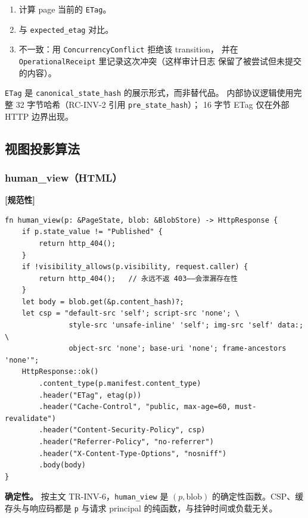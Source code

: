 \documentclass[11pt,a4paper]{article}
\newcommand{\normsv}{\textcolor{normativecolor}{\textbf{[规范性]}}\xspace}
\theoremstyle{definition}
\begin{document}
\begin{enumerate}[leftmargin=2.2em,itemsep=0.2em]
    \item 计算 page 当前的 \texttt{ETag}。
    \item 与 \texttt{expected\_etag} 对比。
    \item 不一致：用 \texttt{ConcurrencyConflict} 拒绝该 transition，
    并在 \texttt{OperationalReceipt} 里记录这次冲突（这样审计日志
    保留了被尝试但未提交的内容）。
\end{enumerate}

\begin{notebox}
\texttt{ETag} 是 \texttt{canonical\_state\_hash} 的展示形式，而非替代品。
内部协议逻辑使用完整 32 字节哈希（RC-INV-2 引用 \texttt{pre\_state\_hash}）；
16 字节 ETag 仅在外部 HTTP 边界出现。
\end{notebox}

\subsection{视图投影算法}
\label{sec:algo-views}

\subsubsection{human\_view（HTML）}

\normsv{}

\begin{lstlisting}
fn human_view(p: &PageState, blob: &BlobStore) -> HttpResponse {
    if p.state_value != "Published" {
        return http_404();
    }
    if !visibility_allows(p.visibility, request.caller) {
        return http_404();   // 永远不返 403——会泄漏存在性
    }
    let body = blob.get(&p.content_hash)?;
    let csp = "default-src 'self'; script-src 'none'; \
               style-src 'unsafe-inline' 'self'; img-src 'self' data:; \
               object-src 'none'; base-uri 'none'; frame-ancestors 'none'";
    HttpResponse::ok()
        .content_type(p.manifest.content_type)
        .header("ETag", etag(p))
        .header("Cache-Control", "public, max-age=60, must-revalidate")
        .header("Content-Security-Policy", csp)
        .header("Referrer-Policy", "no-referrer")
        .header("X-Content-Type-Options", "nosniff")
        .body(body)
}
\end{lstlisting}

\textbf{确定性。} 按主文 TR-INV-6，\texttt{human\_view} 是
$(p, \text{blob})$ 的确定性函数。CSP、缓存头与响应码都是
\texttt{p} 与请求 principal 的纯函数，与挂钟时间或负载无关。
\end{document}
